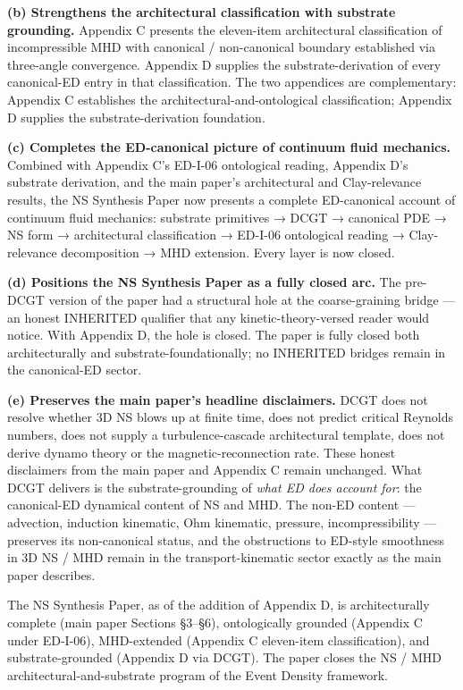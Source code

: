 \documentclass[
  11pt,a4paper]{article}
\begin{document}
\textbf{(b) Strengthens the architectural classification with substrate
grounding.} Appendix C presents the eleven-item architectural
classification of incompressible MHD with canonical / non-canonical
boundary established via three-angle convergence. Appendix D supplies
the substrate-derivation of every canonical-ED entry in that
classification. The two appendices are complementary: Appendix C
establishes the architectural-and-ontological classification; Appendix D
supplies the substrate-derivation foundation.

\textbf{(c) Completes the ED-canonical picture of continuum fluid
mechanics.} Combined with Appendix C's ED-I-06 ontological reading,
Appendix D's substrate derivation, and the main paper's architectural
and Clay-relevance results, the NS Synthesis Paper now presents a
complete ED-canonical account of continuum fluid mechanics: substrate
primitives → DCGT → canonical PDE → NS form → architectural
classification → ED-I-06 ontological reading → Clay-relevance
decomposition → MHD extension. Every layer is now closed.

\textbf{(d) Positions the NS Synthesis Paper as a fully closed arc.} The
pre-DCGT version of the paper had a structural hole at the
coarse-graining bridge --- an honest INHERITED qualifier that any
kinetic-theory-versed reader would notice. With Appendix D, the hole is
closed. The paper is fully closed both architecturally and
substrate-foundationally; no INHERITED bridges remain in the
canonical-ED sector.

\textbf{(e) Preserves the main paper's headline disclaimers.} DCGT does
not resolve whether 3D NS blows up at finite time, does not predict
critical Reynolds numbers, does not supply a turbulence-cascade
architectural template, does not derive dynamo theory or the
magnetic-reconnection rate. These honest disclaimers from the main paper
and Appendix C remain unchanged. What DCGT delivers is the
substrate-grounding of \emph{what ED does account for}: the canonical-ED
dynamical content of NS and MHD. The non-ED content --- advection,
induction kinematic, Ohm kinematic, pressure, incompressibility ---
preserves its non-canonical status, and the obstructions to ED-style
smoothness in 3D NS / MHD remain in the transport-kinematic sector
exactly as the main paper describes.

The NS Synthesis Paper, as of the addition of Appendix D, is
architecturally complete (main paper Sections §3--§6), ontologically
grounded (Appendix C under ED-I-06), MHD-extended (Appendix C
eleven-item classification), and substrate-grounded (Appendix D via
DCGT). The paper closes the NS / MHD architectural-and-substrate program
of the Event Density framework.
\end{document}

